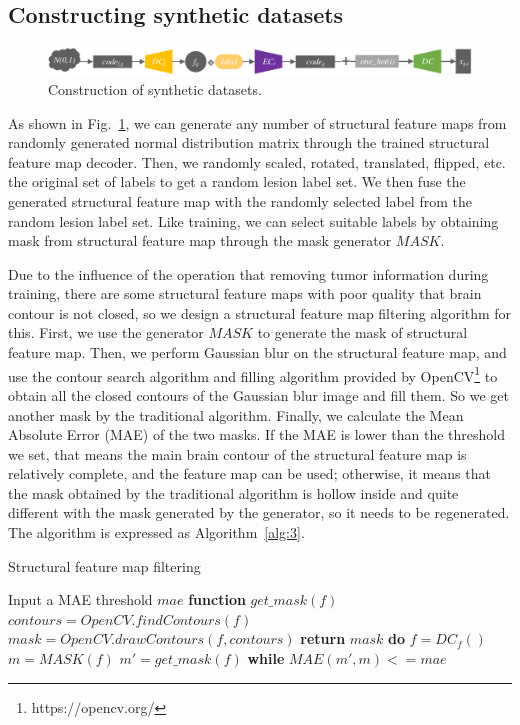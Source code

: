 \documentclass[letterpaper]{article} %
\begin{document}
\subsection{Constructing synthetic datasets}
\label{make dataset}
\begin{figure}
	\centering
	\includegraphics[width=0.98\columnwidth]{figures/make_data}
	\caption{Construction of synthetic datasets.}
	\label{make_data}
\end{figure}
As shown in Fig.~\ref{make_data}, we can generate any number of structural feature maps from randomly generated normal distribution matrix through the trained structural feature map decoder. Then, we randomly scaled, rotated, translated, flipped, etc. the original set of labels to get a random lesion label set. We then fuse the generated structural feature map with the randomly selected label from the random lesion label set. Like training, we can select suitable labels by obtaining mask from structural feature map through the mask generator $MASK$.

Due to the influence of the operation that removing tumor information during training, there are some structural feature maps with poor quality that brain contour is not closed, so we design a structural feature map filtering algorithm for this. First, we use the generator $MASK$ to generate the mask of structural feature map. Then, we perform Gaussian blur\cite{92wink2004denoising} on the structural feature map, and use the contour search algorithm and filling algorithm provided by OpenCV\footnote{https://opencv.org/} to obtain all the closed contours of the Gaussian blur image and fill them. So we get another mask by the traditional algorithm. Finally, we calculate the Mean Absolute Error (MAE) of the two masks. If the MAE is lower than the threshold we set, that means the main brain contour of the structural feature map is relatively complete, and the feature map can be used; otherwise, it means that the mask obtained by the traditional algorithm is hollow inside and quite different with the mask generated by the generator, so it needs to be regenerated. The algorithm is expressed as Algorithm~\ref{alg:3}.
\begin{algorithm}
	\caption{Structural feature map filtering}
	\label{alg:3}
	\begin{algorithmic}[1]
		\State Input a MAE threshold $mae$
		\State \textbf{function} $get\_mask(f)$
		\State \indent$contours = OpenCV.findContours(f)$
		\State \indent$mask =OpenCV.drawContours(f,contours)$
		\State \indent\textbf{return} $mask$
		\State \textbf{do} 
		\State \indent$f = DC_f()$
		\State \indent$m = MASK(f)$
		\State \indent$m'= get\_mask(f)$
		\State \textbf{while} $MAE(m',m) <= mae$
	\end{algorithmic}  
\end{algorithm}
\end{document}
